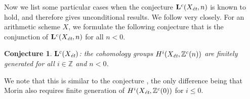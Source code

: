 \documentclass[draft,leqno,12pt]{article}
\theoremstyle{plain}
\newtheorem{proposition}[theorem]{\indent\sc Proposition}
\newtheorem{conjecture}[theorem]{\indent\sc Conjecture}
\theoremstyle{definition}
\newcommand{\ZZ}{\mathbb{Z}}
\newcommand{\FF}{\mathbb{F}}
\newcommand{\et}{\text{\it \'{e}t}}
\begin{document}




Now we list some particular cases when the conjecture $\mathbf{L}^c (X_\et,n)$
is known to hold, and therefore gives unconditional results. We follow
\cite[\S 5]{Morin-2014} very closely. For an arithmetic scheme $X$, we formulate
the following conjecture that is the conjunction of $\mathbf{L}^c (X_\et,n)$ for
all $n < 0$.

\begin{conjecture}
  $\mathbf{L}^c (X_\et)$: the cohomology groups $H^i (X_\et, \ZZ^c (n))$ are
  finitely generated for all $i \in \ZZ$ and $n < 0$.
\end{conjecture}

We note that this is similar to the conjecture
\cite[Definition~5.8]{Morin-2014}, the only difference being that Morin also
requires finite generation of $H^i (X_\et, \ZZ^c (0))$ for $i \le 0$.
\end{document}
